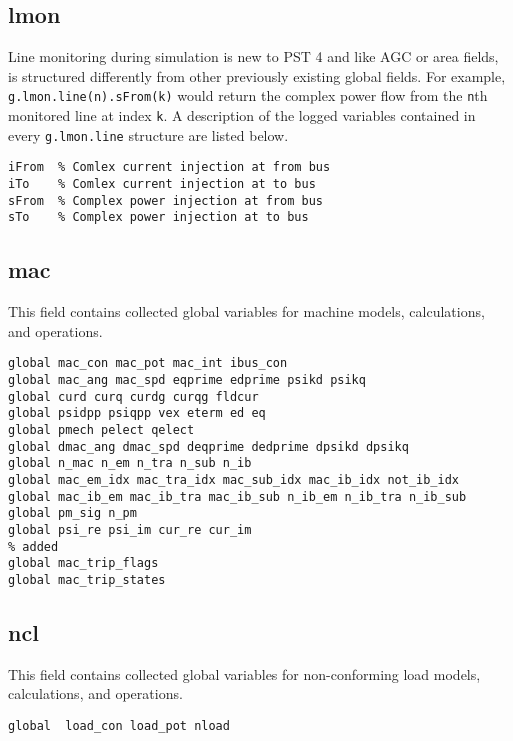 \subsection{lmon}  
Line monitoring during simulation is new to PST 4 and like AGC or area fields, is structured  differently from other previously existing global fields.
For example, \verb|g.lmon.line(n).sFrom(k)| would return the complex power flow from the \verb|n|th monitored line at index \verb|k|.
A description of the logged variables contained in every \verb|g.lmon.line| structure are listed below.

\begin{verbatim}
iFrom  % Comlex current injection at from bus
iTo    % Comlex current injection at to bus
sFrom  % Complex power injection at from bus
sTo    % Complex power injection at to bus
\end{verbatim}

\subsection{mac}
This field contains collected global variables for machine models, calculations, and operations.
\begin{verbatim}
global mac_con mac_pot mac_int ibus_con
global mac_ang mac_spd eqprime edprime psikd psikq
global curd curq curdg curqg fldcur
global psidpp psiqpp vex eterm ed eq
global pmech pelect qelect
global dmac_ang dmac_spd deqprime dedprime dpsikd dpsikq
global n_mac n_em n_tra n_sub n_ib
global mac_em_idx mac_tra_idx mac_sub_idx mac_ib_idx not_ib_idx
global mac_ib_em mac_ib_tra mac_ib_sub n_ib_em n_ib_tra n_ib_sub
global pm_sig n_pm 
global psi_re psi_im cur_re cur_im
% added
global mac_trip_flags
global mac_trip_states
\end{verbatim}

\subsection{ncl}
This field contains collected global variables for non-conforming load models, calculations, and operations.
\begin{verbatim}
global  load_con load_pot nload
\end{verbatim}

